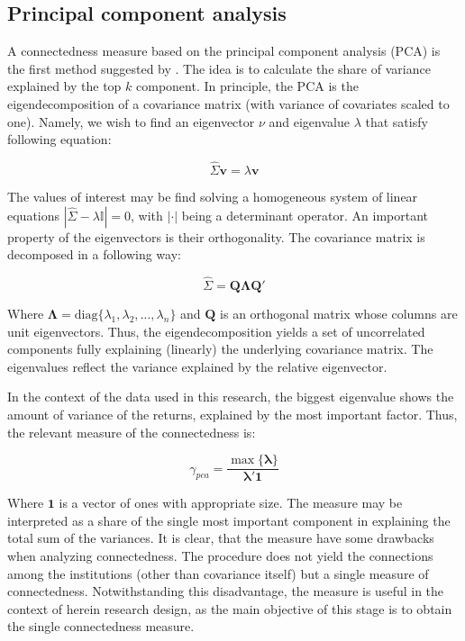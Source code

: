 \documentclass[12pt]{article}
\begin{document}
\subsection{Principal component analysis}\label{subsection:pca}

A connectedness measure based on the principal component analysis (PCA) is the first method suggested by \cite{billio12}. The idea is to calculate the share of variance explained by the top $k$ component. In principle, the PCA is the eigendecomposition of a covariance matrix (with variance of covariates scaled to one). Namely, we wish to find an eigenvector $\nu$ and eigenvalue $\lambda$ that satisfy following equation:

\begin{equation}
	\hat{\Sigma} \mathbf{v} = \lambda \mathbf{v}
\end{equation}

The values of interest may be find solving a homogeneous system of
linear equations $|\hat{\Sigma} - \lambda \mathbb{I}| = 0$, with $|\cdot|$ being a determinant operator. An important property of the eigenvectors is their orthogonality. The covariance matrix is decomposed in a following way:

\begin{equation}
	\hat{\Sigma} = \mathbf{Q}\mathbf{\Lambda}\mathbf{Q}'
\end{equation}

Where $\mathbf{\Lambda} = \text{diag} \{\lambda_1, \lambda_2, \dots, \lambda_n \}$ and $\mathbf{Q}$ is an orthogonal matrix whose columns are unit eigenvectors. Thus, the eigendecomposition yields a set of uncorrelated components fully explaining (linearly) the underlying covariance matrix. The eigenvalues reflect the variance explained by the relative eigenvector.

In the context of the data used in this research, the biggest eigenvalue shows the amount of variance of the returns, explained by the most important factor. Thus, the relevant measure of the connectedness is:

\begin{equation}
	\gamma_{pca} = \frac{\max \{\mathbf{\lambda}\}}{\mathbf{\lambda}'\mathbf{1}}
\end{equation}

Where $\mathbf{1}$ is a vector of ones with appropriate size. The measure may be interpreted as a share of the single most important component in explaining the total sum of the variances. It is clear, that the measure have some drawbacks when analyzing connectedness. The procedure does not yield the connections among the institutions (other than covariance itself) but a single measure of connectedness. Notwithstanding this disadvantage, the measure is useful in the context of herein research design, as the main objective of this stage is to obtain the single connectedness measure. 
\end{document}
